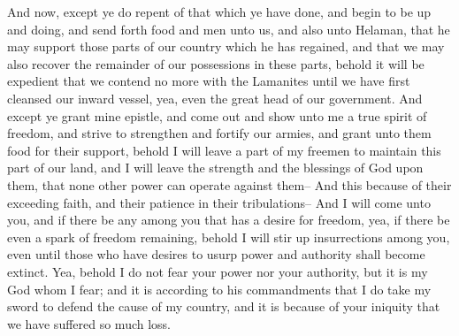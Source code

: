 And now, except ye do repent of that which ye have done, and begin to be up and doing, and send forth food and men unto us, and also unto Helaman, that he may support those parts of our country which he has regained, and that we may also recover the remainder of our possessions in these parts, behold it will be expedient that we contend no more with the Lamanites until we have first cleansed our inward vessel, yea, even the great head of our government.
\bverse \iffalse And except ye grant mine epistle, and come out and show unto me a true spirit of freedom, and strive to strengthen and fortify our armies, and grant unto them food for their support, behold I will leave a part of my freemen to maintain this part of our land, and I will leave the strength and the blessings of God upon them, that none other power can operate against them-- \fi
And except ye grant mine epistle, and come out and show unto me a true spirit of freedom, and strive to strengthen and fortify our armies, and grant unto them food for their support, behold I will leave a part of my freemen to maintain this part of our land, and I will leave the strength and the blessings of God upon them, that none other power can operate against them--
\bverse \iffalse And this because of their exceeding faith, and their patience in their tribulations-- \fi
And this because of their exceeding faith, and their patience in their tribulations--
\bverse \iffalse And I will come unto you, and if there be any among you that has a desire for freedom, yea, if there be even a spark of freedom remaining, behold I will stir up insurrections among you, even until those who have desires to usurp power and authority shall become extinct. \fi
And I will come unto you, and if there be any among you that has a desire for freedom, yea, if there be even a spark of freedom remaining, behold I will stir up insurrections among you, even until those who have desires to usurp power and authority shall become extinct.
\bverse \iffalse Yea, behold I do not fear your power nor your authority, but it is my God whom I fear; and it is according to his commandments that I do take my sword to defend the cause of my country, and it is because of your iniquity that we have suffered so much loss. \fi
Yea, behold I do not fear your power nor your authority, but it is my God whom I fear; and it is according to his commandments that I do take my sword to defend the cause of my country, and it is because of your iniquity that we have suffered so much loss.
\bverse \iffalse Behold it is time, yea, the time is now at hand, that except ye do bestir yourselves in the defence of your country and your little ones, the sword of justice doth hang over you; yea, and it shall fall upon you and visit you even to your utter destruction. \fi
